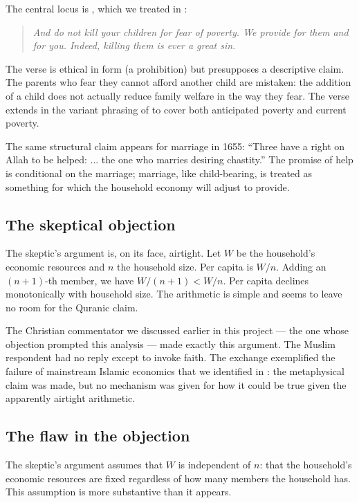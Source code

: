 The central locus is , which we treated in
:

\begin{quote}
\textit{And do not kill your children for fear of poverty. We
provide for them and for you. Indeed, killing them is ever a great
sin.}
\end{quote}

The verse is ethical in form (a prohibition) but presupposes a
descriptive claim. The parents who fear they cannot afford another
child are mistaken: the addition of a child does not actually
reduce family welfare in the way they fear. The verse extends in
the variant phrasing of  to cover both anticipated
poverty and current poverty.

The same structural claim appears for marriage in
 1655: ``Three have a right on Allah to be helped:
... the one who marries desiring chastity.'' The promise of help
is conditional on the marriage; marriage, like child-bearing, is
treated as something for which the household economy will adjust to
provide.

\subsection{The skeptical objection}

The skeptic's argument is, on its face, airtight. Let $W$ be the
household's economic resources and $n$ the household size. Per
capita is $W/n$. Adding an $(n+1)$-th member, we have $W/(n+1) <
W/n$. Per capita declines monotonically with household size. The
arithmetic is simple and seems to leave no room for the Quranic
claim.

The Christian commentator we discussed earlier in this project ---
the one whose objection prompted this analysis --- made exactly this
argument. The Muslim respondent had no reply except to invoke
faith. The exchange exemplified the failure of mainstream Islamic
economics that we identified in : the
metaphysical claim was made, but no mechanism was given for how it
could be true given the apparently airtight arithmetic.

\subsection{The flaw in the objection}

The skeptic's argument assumes that $W$ is independent of $n$:
that the household's economic resources are fixed regardless of how
many members the household has. This assumption is more substantive
than it appears.

